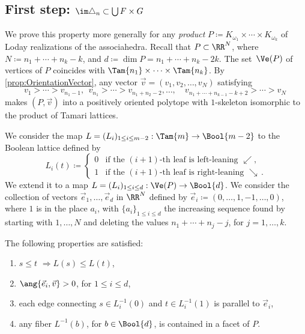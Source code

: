\subsection{First step: $\im \triangle_n \subset \bigcup F\times G$}\label{Subsec:Subset}
We prove this property more generally for any \emph{product} $P \coloneqq K_{\omega_1}\times \cdots \times K_{\omega_k}$ of Loday realizations of the associahedra. Recall that
$P\subset \RR^{N}$, where $N\coloneqq n_1+\cdots+n_k-k$, and $d\coloneqq \dim P = n_1+\cdots+n_k-2k$.
The set~$\Ve(P)$ of vertices of $P$ coincides with
$\Tam{n_1}\times \cdots \times \Tam{n_k}$.
By \cref{prop:OrientationVector}, any vector
$\vec v= (v_1, v_2, \ldots, v_N)$ satisfying
\[v_1>\cdots>v_{n_1-1},\ \ v_{n_1}>\cdots>v_{n_1+n_2-2},\ldots, \quad v_{n_1+\cdots+n_{k-1}-k+2}>\cdots>v_{N}\ \]
makes $(P, \vec v)$ into a positively oriented polytope with $1$-skeleton isomorphic to the product of Tamari lattices.

We consider the map $L=(L_i)_{1\leq i\leq m-2} : \Tam{m}\to \Bool{m-2}$
to the Boolean lattice
defined by
\[
L_i(t)\coloneqq\begin{cases}
0& \text{if the $(i+1)$-th leaf is left-leaning $\swarrow$,}\\
1& \text{if the $(i+1)$-th leaf is right-leaning $\searrow$}\,.
\end{cases}
\]
We extend it to a map $L=(L_i)_{1\leq i \leq d}: \Ve(P)\to \Bool{d}$. We consider the collection of vectors
$\vec e_1, \ldots, \vec e_d$ in $\RR^N$ defined by
$\vec e_i\coloneqq (0, \ldots, 1, -1, \ldots, 0)$, where $1$ is in the
place $a_i$, with $\{a_i\}_{1\leq i \leq d}$ the increasing sequence found by starting with $1,\dots, N$ and deleting the values $n_1+\cdots+n_j-j$, for $j = 1,\ldots, k$.

\begin{lemma}\label{lemma:propertiesofL}
The following properties are satisfied:
\begin{enumerate}
\item\label{lemma:propertiesofL1} $s\leq t$ $\Rightarrow L(s)\leq L(t)$,

\item\label{lemma:propertiesofL2} $\ang{\vec e_i, \vec v} >0$, for $1\leq i \leq d$,

\item\label{lemma:propertiesofL3} each edge connecting $s\in L^{-1}_i (0)$ and $t\in L^{-1}_i(1)$ is parallel to $\vec e_i$,

\item\label{lemma:propertiesofL4} any fiber $L^{-1}(b)$, for $b\in \Bool{d}$, is contained in a facet of $P$.
\end{enumerate}
\end{lemma}

